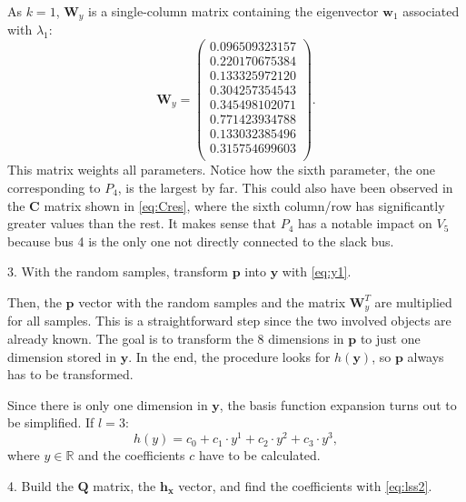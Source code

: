 As $k=1$, $\mathbf{W}_y$ is a single-column matrix containing the eigenvector $\mathbf{w}_1$ associated with $\lambda_1$:
\begin{equation}
  \mathbf{W}_y = \begin{pmatrix}
 0.096509323157 \\
 0.220170675384 \\
 0.133325972120 \\
 0.304257354543 \\
 0.345498102071 \\
 0.771423934788 \\
 0.133032385496 \\
 0.315754699603 \\
  \end{pmatrix}.
  \label{eq:eigenvec}
\end{equation}
This matrix weights all parameters. Notice how the sixth parameter, the one corresponding to $P_4$, is the largest by far. This could also have been observed in the $\mathbf{C}$ matrix shown in \eqref{eq:Cres}, where the sixth column/row has significantly greater values than the rest. It makes sense that $P_4$ has a notable impact on $V_5$ because bus 4 is the only one not directly connected to the slack bus. 

\hspace{0.32cm} 3. With the random samples, transform $\mathbf{p}$ into $\mathbf{y}$ with \eqref{eq:y1}. 

Then, the $\mathbf{p}$ vector with the random samples and the matrix $\mathbf{W}_y^T$ are multiplied for all samples. This is a straightforward step since the two involved objects are already known. The goal is to transform the 8 dimensions in $\mathbf{p}$ to just one dimension stored in $\mathbf{y}$. In the end, the procedure looks for $h(\mathbf{y})$, so $\mathbf{p}$ always has to be transformed. 

Since there is only one dimension in $\mathbf{y}$, the basis function expansion turns out to be simplified. If $l=3$:
\begin{equation}
  h(y) = c_0 + c_1 \cdot y^1 + c_2 \cdot y^2 + c_3 \cdot y^3,
  \label{eq:hy}
\end{equation}
where $y \in \mathbb{R}$ and the coefficients $c$ have to be calculated.  

\hspace{0.32cm} 4. Build the $\mathbf{Q}$ matrix, the $\mathbf{h_x}$ vector, and find the coefficients with \eqref{eq:lss2}. 

